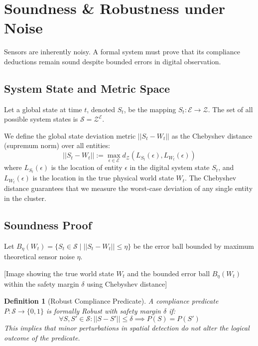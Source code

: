 \documentclass[conference]{IEEEtran}
\newtheorem{definition}{Definition}
\newcommand{\E}{\mathcal{E}} %
\newcommand{\Z}{\mathcal{Z}} %
\newcommand{\Sstate}{\mathcal{S}} %
\begin{document}
\section{Soundness \& Robustness under Noise}

Sensors are inherently noisy. A formal system must prove that its compliance deductions remain sound despite bounded errors in digital observation.

\subsection{System State and Metric Space}
Let a global state at time $t$, denoted $S_t$, be the mapping $S_t: \E \to \Z$. The set of all possible system states is $\Sstate = \Z^\E$.

We define the global state deviation metric $||S_t - W_t||$ as the Chebyshev distance (supremum norm) over all entities:
\begin{equation}
||S_t - W_t|| := \max_{\epsilon \in \E} d_\Z(L_{S_t}(\epsilon), L_{W_t}(\epsilon))
\end{equation}
where $L_{S_t}(\epsilon)$ is the location of entity $\epsilon$ in the digital system state $S_t$, and $L_{W_t}(\epsilon)$ is the location in the true physical world state $W_t$. The Chebyshev distance guarantees that we measure the worst-case deviation of any single entity in the cluster.

\subsection{Soundness Proof}
Let $B_\eta(W_t) = \{ S_t \in \Sstate \mid ||S_t - W_t|| \le \eta \}$ be the error ball bounded by maximum theoretical sensor noise $\eta$.

[Image showing the true world state $W_t$ and the bounded error ball $B_\eta(W_t)$ within the safety margin $\delta$ using Chebyshev distance]

\begin{definition}[Robust Compliance Predicate]
A compliance predicate $P: \Sstate \to \{0, 1\}$ is formally \textit{Robust} with safety margin $\delta$ if:
\begin{equation}
\forall S, S' \in \Sstate: ||S - S'|| \le \delta \implies P(S) = P(S')
\end{equation}
This implies that minor perturbations in spatial detection do not alter the logical outcome of the predicate.
\end{definition}
\end{document}
